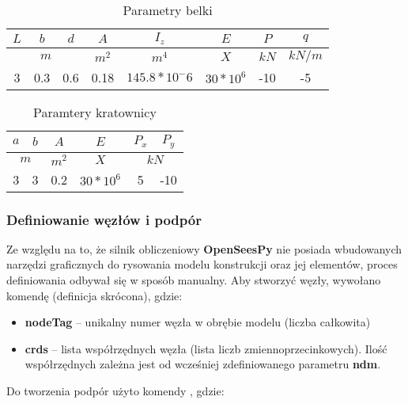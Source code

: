 \begin{table}[!htbp]
    \centering
    \begin{tabular}{|c|c|c|c|c|c|c|c|}
        \hline
        $L$ & $b$ & $d$ & $A$ & $I_z$ & $E$ & $P$ & $q$ \\
        \hline
        \multicolumn{3}{|c|}{$m$} & $m^2$ & $m^4$ & $X$ & $kN$ & $kN/m$ \\
        \hline
        3 & 0.3 & 0.6 & 0.18 & $145.8*10^-6$ & $30*10^6$ & -10 & -5 \\
        \hline
    \end{tabular}
    \caption{Parametry belki}
    \label{tab:pars-belka}
\end{table}

\begin{table}[!htbp]
    \centering
    \begin{tabular}{|c|c|c|c|c|c|}
        \hline
        $a$ & $b$ & $A$ & $E$ & $P_x$ & $P_y$ \\
        \hline
        \multicolumn{2}{|c|}{$m$} & $m^2$ & $X$ & \multicolumn{2}{|c|}{$kN$} \\
        \hline
        3 & 3 & 0.2 & $30*10^6$ & 5 & -10 \\
        \hline
    \end{tabular}
    \caption{Paramtery kratownicy}
    \label{tab:pars-kratownica}
\end{table}

\subsubsection{Definiowanie węzłów i podpór}

Ze względu na to, że silnik obliczeniowy \textbf{OpenSeesPy} nie posiada wbudowanych narzędzi graficznych do rysowania
modelu konstrukcji oraz jej elementów, proces definiowania odbywał się w sposób manualny.
Aby stworzyć węzły, wywołano komendę  (definicja skrócona), gdzie:

\begin{itemize}
    \item \textbf{nodeTag} – unikalny numer węzła w obrębie modelu (liczba całkowita)
    \item \textbf{crds} – lista współrzędnych węzła (lista liczb zmiennoprzecinkowych). Ilość współrzędnych zależna jest od wcześniej zdefiniowanego parametru \textbf{ndm}.
\end{itemize}

Do tworzenia podpór użyto komendy , gdzie:

